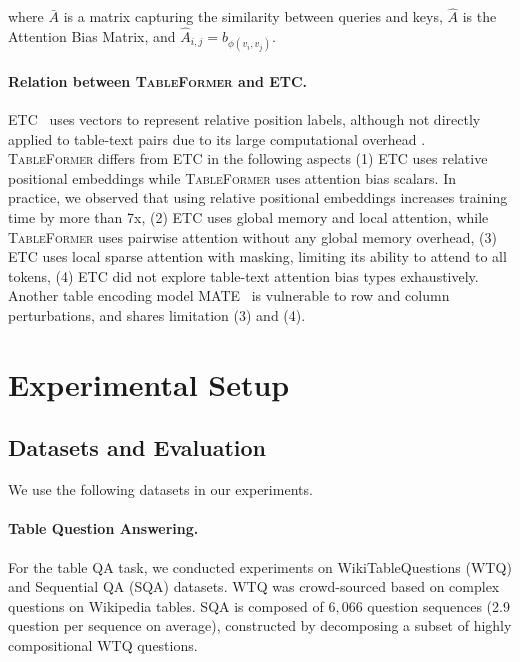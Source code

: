 \documentclass[11pt]{article}
\begin{document}
where $\bar{A}$ is a matrix capturing the similarity between queries and keys, $\hat{A}$ is the Attention Bias Matrix, and $\hat{A}_{i,j} = b_{\phi(v_i, v_j)}$. 

\paragraph{Relation between \textsc{TableFormer} and ETC.}
\label{para:ETC}
ETC~\cite{ainslie2020etc} uses vectors to represent relative position labels, although not directly applied to table-text pairs due to its large computational overhead \cite{eisenschlos2021mate}. \textsc{TableFormer} differs from ETC in the following aspects (1) ETC uses relative positional embeddings while \textsc{TableFormer} uses attention bias scalars. In practice, we observed that using relative positional embeddings increases training time by more than 7x, (2) ETC uses global memory and local attention, while \textsc{TableFormer} uses pairwise attention without any global memory overhead, (3) ETC uses local sparse attention with masking, limiting its ability to attend to all tokens, (4) ETC did not explore table-text attention bias types exhaustively. Another table encoding model \textsc{MATE}~\cite{eisenschlos2021mate} is vulnerable to row and column perturbations, and  shares limitation (3) and (4).





\section{Experimental Setup}

\subsection{Datasets and Evaluation}
We use the following datasets in our experiments.
\paragraph{Table Question Answering.} For the table QA task, we conducted experiments on WikiTableQuestions (\textsc{WTQ}) \cite{pasupat2015compositional} and Sequential QA (SQA) \cite{iyyer2017search} datasets. \textsc{WTQ} was crowd-sourced based on complex questions on Wikipedia tables. SQA is composed of $6,066$ question sequences
(2.9 question per sequence on average), constructed by decomposing a subset of highly compositional \textsc{WTQ} questions. 
\end{document}
